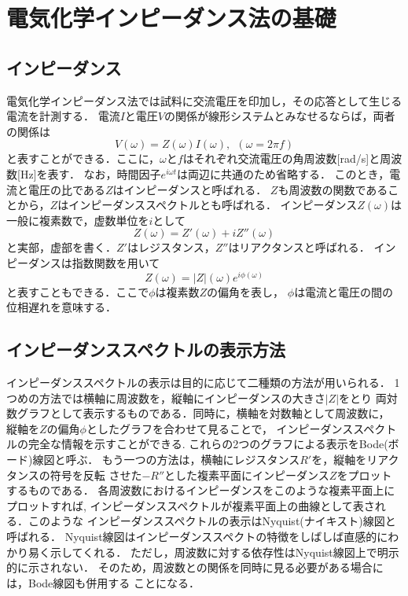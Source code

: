 \chapter{電気化学インピーダンス法の基礎}
\section{インピーダンス}
電気化学インピーダンス法では試料に交流電圧を印加し，その応答として生じる電流を計測する．
電流$I$と電圧$V$の関係が線形システムとみなせるならば，両者の関係は
\begin{equation}
	V(\omega)= Z(\omega) I(\omega), \ \ (\omega=2\pi f)
	\label{eqn:I2V}
\end{equation}
と表すことができる．ここに，$\omega$と$f$はそれぞれ交流電圧の角周波数[rad/s]と周波数[Hz]を表す．
なお，時間因子$e^{i\omega t}$は両辺に共通のため省略する．
このとき，電流と電圧の比である$Z$はインピーダンスと呼ばれる．
$Z$も周波数の関数であることから，$Z$はインピーダンススペクトルとも呼ばれる．
インピーダンス$Z(\omega)$は一般に複素数で，虚数単位を$i$として
\begin{equation}
	Z(\omega)=Z'(\omega)+iZ''(\omega)
	\label{eqn:Z_cmplx}
\end{equation}
と実部，虚部を書く．$Z'$はレジスタンス，$Z''$はリアクタンスと呼ばれる．
インピーダンスは指数関数を用いて
\begin{equation}
	Z(\omega)=\left| Z \right|(\omega)e ^{i\phi(\omega)}
	\label{eqn:}
\end{equation}
と表すこともできる．ここで$\phi$は複素数$Z$の偏角を表し，
$\phi$は電流と電圧の間の位相遅れを意味する．
%
\section{インピーダンススペクトルの表示方法}
インピーダンススペクトルの表示は目的に応じて二種類の方法が用いられる．
1つめの方法では横軸に周波数を，縦軸にインピーダンスの大きさ$|Z|$をとり
両対数グラフとして表示するものである．同時に，横軸を対数軸として周波数に，
縦軸を$Z$の偏角$\phi$としたグラフを合わせて見ることで，
インピーダンススペクトルの完全な情報を示すことができる.
これらの2つのグラフによる表示をBode(ボード)線図と呼ぶ．
もう一つの方法は，横軸にレジスタンス$R'$を，縦軸をリアクタンスの符号を反転
させた$-R''$とした複素平面にインピーダンス$Z$をプロットするものである．
各周波数におけるインピーダンスをこのような複素平面上にプロットすれば,
インピーダンススペクトルが複素平面上の曲線として表される．このような
インピーダンススペクトルの表示はNyquist(ナイキスト)線図と呼ばれる．
Nyquist線図はインピーダンススペクトの特徴をしばしば直感的にわかり易く示してくれる．
ただし，周波数に対する依存性はNyquist線図上で明示的に示されない．
そのため，周波数との関係を同時に見る必要がある場合には，Bode線図も併用する
ことになる．
%
